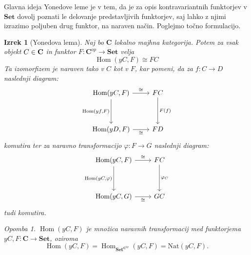 \documentclass[12pt,a4paper]{book}
\theoremstyle{definition}
\theoremstyle{plain}
\newtheorem{izrek}[definicija]{Izrek}
\theoremstyle{definition}
\theoremstyle{remark}
\newtheorem*{opomba}{Opomba}
\newcommand{\cat}[1]{\textbf{#1}}
\DeclareMathOperator{\Hom}{Hom}
\begin{document}
Glavna ideja Yonedove leme je v tem, da je za opis kontravariantnih funktorjev v $\cat{Set}$ dovolj poznati le delovanje predstavljivih funktorjev, saj lahko z njimi izrazimo poljuben drug funktor, na naraven način. Poglejmo točno formulacijo.


\begin{izrek}[Yonedova lema]
Naj bo $\cat{C}$ lokalno majhna kategorija. Potem za vsak objekt $C \in \bf{C}$ in funktor $F : \cat{C}^{op} \to \cat{Set}$ velja
$$\Hom(yC,F) \cong FC$$
Ta izomorfizem je naraven tako v $C$ kot v $F$, kar pomeni, da za $f : C \to D$ naslednji diagram:
%
\begin{equation} \label{diag1}
\begin{tikzcd}[row sep=huge]
\Hom(yC,F) \arrow[r, "\cong"] \arrow[d, "{\Hom(yf,F)}"'] & FC \arrow[d, "F(f)"] \\
\Hom(yD,F) \arrow[r, "\cong"'] & FD
\end{tikzcd}
\end{equation}
%
komutira ter za naravno transformacijo $\varphi : F \to G$ naslednji diagram:
%
\begin{equation} \label{diag2}
\begin{tikzcd}[row sep=huge]
\Hom(yC,F) \arrow[r, "\cong"] \arrow[d, "{\Hom(yC,}\varphi\text{)}"'] & FC \arrow[d, "\varphi_C"] \\
\Hom(yC,G) \arrow[r, "\cong"']	&	GC
\end{tikzcd}
\end{equation}
tudi komutira.
%
\begin{opomba}
 $\Hom(yC,F)$ je množica naravnih transformacij med funktorjema $yC,F : \cat{C} \to \cat{Set}$, oziroma 
 $$\Hom(yC,F) = \Hom_{\cat{Set}^{\cat{C}^{op}}}(yC,F) = \mathrm{Nat}(yC,F).$$
\end{opomba}
%
\end{izrek}
\end{document}
